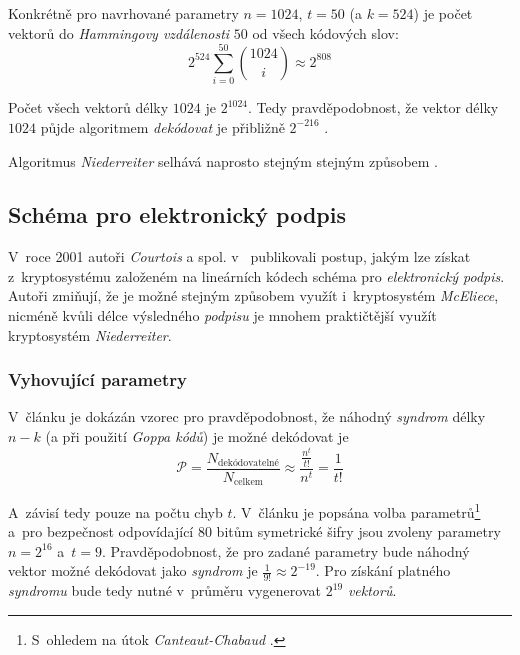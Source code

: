 \documentclass[thesis=M,czech,hidelinks]{FITthesis}[2012/06/26]
\newcommand{\0}{{\textcolor[gray]{0.75}{0}}}
\begin{document}
Konkrétně pro navrhované parametry $n=1024$, $t=50$ (a $k=524$) je počet vektorů
do \emph{Hammingovy vzdálenosti} $50$ od všech kódových slov:
$$ 2^{524}\sum_{i = 0}^{50}\binom{1024}{i} \approx 2^{808} $$

Počet všech vektorů délky $1024$ je $2^{1024}$. Tedy pravděpodobnost, že vektor
délky $1024$ půjde algoritmem \emph{dekódovat} je přibližně $2^{-216}$
\cite{McEliece}.

Algoritmus \emph{Niederreiter} selhává naprosto stejným stejným způsobem
\cite{Courtois}.

\subsection{Schéma pro elektronický podpis}\label{kap_schema_pro_podpis}

V~roce 2001 autoři \emph{Courtois} a spol. v~\cite{Courtois} publikovali postup,
jakým lze získat z~kryptosystému založeném na lineárních kódech schéma pro
\emph{elektronický podpis}. Autoři zmiňují, že je možné stejným způsobem využít
i~kryptosystém \emph{McEliece}, nicméně kvůli délce výsledného \emph{podpisu} je
mnohem praktičtější využít kryptosystém \emph{Niederreiter}.

\subsubsection{Vyhovující parametry}

V~článku je dokázán vzorec pro pravděpodobnost, že náhodný \emph{syndrom} délky
$n-k$ (a při použití \emph{Goppa kódů}) je možné dekódovat je
$$
    \mathcal{P} = \frac{N_{\text{dekódovatelné}}}{N_{\text{celkem}}} \approx
    \frac{\frac{n^t}{t!}}{n^t} = \frac{1}{t!}
$$


A~závisí tedy pouze na počtu chyb $t$. V~článku je popsána volba
parametrů\footnote{
    S~ohledem na útok \emph{Canteaut-Chabaud} \cite{Canteaut}.
} a~pro bezpečnost odpovídající $80$ bitům symetrické šifry jsou zvoleny
parametry $n=2^{16}$ a~$t=9$.  Pravděpodobnost, že pro zadané parametry bude
náhodný vektor možné dekódovat jako \emph{syndrom} je $\frac{1}{9!} \approx
2^{-19}$. Pro získání platného \emph{syndromu} bude tedy nutné v~průměru
vygenerovat $2^{19}$ \emph{vektorů}.
\end{document}
